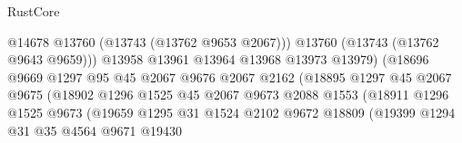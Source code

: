 \begin{lexlean}{RustCore}
\begin{coremodule}
                                            @14678
                                            @13760
                                            (@13743 (@13762 @9653 @2067)))
                                          @13760
                                          (@13743 (@13762 @9643 @9659)))
                                        @13958
                                        @13961
                                        @13964
                                        @13968
                                        @13973
                                        @13979)
                                      (@18696
                                        @9669
                                        @1297
                                        @95
                                        @45
                                        @2067
                                        @9676
                                        @2067
                                        @2162
                                        (@18895
                                          @1297
                                          @45
                                          @2067
                                          @9675
                                          (@18902
                                            @1296
                                            @1525
                                            @45
                                            @2067
                                            @9673
                                            @2088
                                            @1553
                                            (@18911
                                              @1296
                                              @1525
                                              @9673
                                              (@19659
                                                @1295
                                                @31
                                                @1524
                                                @2102
                                                @9672
                                                @18809
                                                (@19399
                                                  @1294
                                                  @31
                                                  @35
                                                  @4564
                                                  @9671
                                                  @19430

\end{coremodule}
\end{lexlean}
